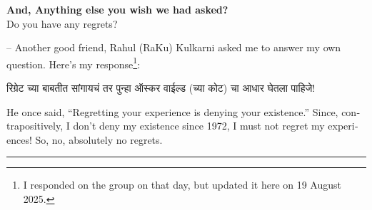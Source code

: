 \documentclass[17pt]{extarticle}  %
\begin{document}
\begin{enumerate}
\begin{english}
\item\textbf{And, Anything else you wish we had asked?}\\

Do you have any regrets?

-- Another good friend, Rahul (RaKu) Kulkarni asked me to answer my own question. Here's my response\footnote{I responded on the group on that day, but updated it here on 19 August 2025.}: 

\begin{marathi}रिग्रेट च्या बाबतीत सांगायचं तर पुन्हा ऑस्कर वाईल्ड (च्या कोट) चा आधार घेतला पाहिजे!\end{marathi} He once said, ``Regretting your experience is denying your existence.'' Since, contrapositively, I don't deny my existence since 1972, I must not regret my experiences! So, no, absolutely no regrets.
\end{english}
\end{enumerate}
\vspace{5mm}
\hrule
\end{document}
